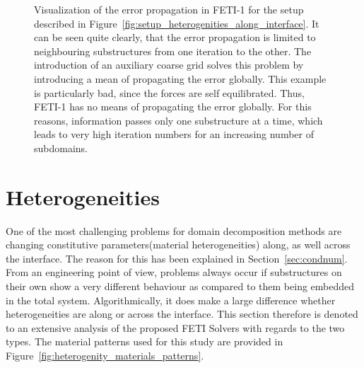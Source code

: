 \begin{figure}[tb]
  \begin{center}
    
    \caption[Limited error propagation FETI-1]{Visualization of the error propagation in FETI-1 for the setup described in Figure~\ref{fig:setup_heterogenities_along_interface}. It can be seen quite clearly, that the error propagation is limited to neighbouring substructures from one iteration to the other. The introduction of an auxiliary coarse grid solves this problem by introducing a mean of propagating the error globally. This example is particularly bad, since the forces are self equilibrated. Thus, FETI-1 has no means of propagating the error globally. For this reasons, information passes only one substructure at a time, which leads to very high iteration numbers for an increasing number of subdomains. }
    \label{fig:beam_error_propagation}
  \end{center}
\end{figure}

\section{Heterogeneities}\label{sec:heterogeneities}
One of the most challenging problems for domain decomposition methods are changing constitutive parameters(material heterogeneities) along, as well across the interface. The reason for this has been explained in Section~\ref{sec:condnum}.\\
From an engineering point of view, problems always occur if substructures on their own show a very different behaviour as compared to them being embedded in the total system. Algorithmically, it does make a large difference whether heterogeneities are along or across the interface. This section therefore is denoted to an extensive analysis of the proposed FETI Solvers with regards to the two types. The material patterns used for this study are provided in Figure~\ref{fig:heterogenity_materials_patterns}.


